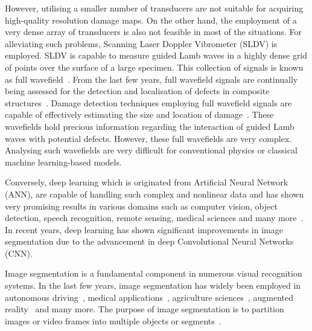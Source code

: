 However, utilising a smaller number of transducers are not suitable for acquiring high-quality resolution damage maps.
On the other hand, the employment of a very dense array of transducers is also not feasible in most of the situations. 
For alleviating such problems, Scanning Laser Doppler Vibrometer (SLDV) is employed. 
SLDV is capable to measure guided Lamb waves in a highly dense grid of points over the surface of a large specimen.
This collection of signals is known as full wavefield~\cite{radzienski2019damage}. 
From the last few years, full wavefield signals are continually being assessed for the detection and localisation of defects in composite
structures~\cite{radzienski2019damage, girolamo2018impact, kudela2018impact, sohn2011delamination, sohn2011automated, rogge2013characterization}.
Damage detection techniques employing full wavefield signals are capable of effectively estimating the size and location of damage~\cite{girolamo2018impact, kudela2018impact}.
These wavefields hold precious information regarding the interaction of guided Lamb waves with potential defects.  
However, these full wavefields are very complex. 
Analysing such wavefields are very difficult for conventional physics or classical machine learning-based models. 

Conversely, deep learning which is originated from Artificial Neural Network (ANN), are capable of handling such complex and nonlinear data and has shown very promising results in various domains such as computer vision, object detection, speech recognition, remote sensing, medical sciences
and many more~\cite{deng2014deep, mohanty2016using, zhang2020well, pashaei2020review}.
In recent years, deep learning has shown significant improvements in image segmentation due to the advancement in deep Convolutional Neural Networks (CNN).

Image segmentation is a fundamental component in numerous visual recognition
systems. In the last few years, image segmentation has widely been
employed in autonomous driving~\cite{zhang2013understanding, cordts2016cityscapes, ros2016synthia, li2018real}, medical applications~\cite{taghanaki2021deep}, agriculture sciences~\cite{milioto2018real}, augmented reality~\cite{miksik2015semantic} and many more. 
The purpose of image segmentation is to partition images or video frames into multiple objects or segments~\cite{szeliski2010computer}.


